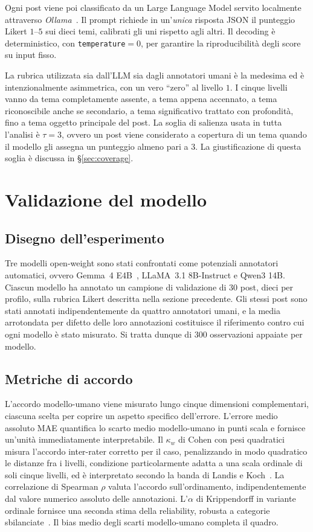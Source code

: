 \documentclass[11pt, a4paper]{article}
\begin{document}
Ogni post viene poi classificato da un Large Language Model servito
localmente attraverso \textit{Ollama}~\cite{ollama}. Il prompt richiede
in un'\emph{unica} risposta JSON il punteggio Likert $1$--$5$ sui dieci
temi, calibrati gli uni rispetto agli altri. Il decoding \`e
deterministico, con \texttt{temperature}$=0$, per garantire la
riproducibilit\`a degli score su input fisso.

La rubrica utilizzata sia dall'LLM sia dagli annotatori umani \`e la
medesima ed \`e intenzionalmente asimmetrica, con un vero ``zero'' al
livello $1$. I cinque livelli vanno da tema completamente assente, a
tema appena accennato, a tema riconoscibile anche se secondario, a
tema significativo trattato con profondità, fino a tema oggetto
principale del post. La soglia di salienza usata in tutta l'analisi \`e
$\tau = 3$, ovvero un post viene considerato a copertura di un tema
quando il modello gli assegna un punteggio almeno pari a $3$. La
giustificazione di questa soglia \`e discussa in \S\ref{sec:coverage}.

\section{Validazione del modello}

\subsection{Disegno dell'esperimento}

Tre modelli open-weight sono stati confrontati come potenziali
annotatori automatici, ovvero Gemma~4 E4B~\cite{gemma2024}, LLaMA~3.1
8B-Instruct e Qwen3 14B. Ciascun modello ha annotato un campione di
validazione di $30$ post, dieci per profilo, sulla rubrica Likert
descritta nella sezione precedente. Gli stessi post sono stati annotati
indipendentemente da quattro annotatori umani, e la media arrotondata
per difetto delle loro annotazioni costituisce il riferimento contro
cui ogni modello \`e stato misurato. Si tratta dunque di $300$
osservazioni appaiate per modello.

\subsection{Metriche di accordo}

L'accordo modello-umano viene misurato lungo cinque dimensioni
complementari, ciascuna scelta per coprire un aspetto specifico
dell'errore. L'errore medio assoluto MAE quantifica lo scarto medio
modello-umano in punti scala e fornisce un'unit\`a immediatamente
interpretabile. Il $\kappa_w$ di Cohen con pesi quadratici misura
l'accordo inter-rater corretto per il caso, penalizzando in modo
quadratico le distanze fra i livelli, condizione particolarmente adatta
a una scala ordinale di soli cinque livelli, ed \`e interpretato
secondo la banda di Landis e Koch~\cite{landis1977}. La correlazione
di Spearman $\rho$ valuta l'accordo sull'ordinamento, indipendentemente
dal valore numerico assoluto delle annotazioni. L'$\alpha$ di
Krippendorff in variante ordinale fornisce una seconda stima della
reliability, robusta a categorie sbilanciate~\cite{krippendorff2004}.
Il bias medio degli scarti modello-umano completa il quadro.
\end{document}
